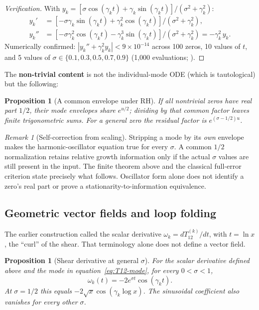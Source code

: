 \documentclass[11pt,a4paper]{article}
\theoremstyle{plain}
\newtheorem{proposition}[theorem]{Proposition}
\theoremstyle{definition}
\theoremstyle{remark}
\newtheorem{remark}[theorem]{Remark}
\begin{document}
\begin{proof}[Verification]
With $y_k = [\sigma\cos(\gamma_k t) + \gamma_k\sin(\gamma_k t)]/(\sigma^2 + \gamma_k^2)$:
\begin{align*}
  y_k' &= [-\sigma\gamma_k\sin(\gamma_k t) + \gamma_k^2\cos(\gamma_k t)] / (\sigma^2 + \gamma_k^2), \\
  y_k'' &= [-\sigma\gamma_k^2\cos(\gamma_k t) - \gamma_k^3\sin(\gamma_k t)] / (\sigma^2 + \gamma_k^2)
         = -\gamma_k^2\, y_k.
\end{align*}
Numerically confirmed: $|y_k'' + \gamma_k^2 y_k| < 9 \times 10^{-14}$
across 100 zeros, 10 values of $t$, and 5 values of $\sigma \in \{0.1, 0.3, 0.5, 0.7, 0.9\}$
(1{,}000 evaluations; ).
\end{proof}

The \textbf{non-trivial content} is not the individual-mode ODE (which
is tautological) but the following:

\begin{proposition}[A common envelope under RH]\label{prop:stationarity}
If all nontrivial zeros have real part $1/2$, their mode envelopes share
$e^{u/2}$; dividing by that common factor leaves finite trigonometric sums.
For a general zero the residual factor is $e^{(\sigma-1/2)u}$.
\end{proposition}
\begin{remark}[Self-correction from scaling]\label{rem:self-correction}
Stripping a mode by its \emph{own} envelope makes the harmonic-oscillator
equation true for every $\sigma$. A common $1/2$ normalization retains
relative growth information only if the actual $\sigma$ values are still
present in the input. The finite theorem above and the classical full-error
criterion state precisely what follows. Oscillator form alone does not
identify a zero's real part or prove a stationarity-to-information equivalence.
\end{remark}

\subsection{Geometric vector fields and loop folding}

The earlier construction called the scalar derivative
$\omega_k=dT_{12}^{(k)}/dt$, with $t=\ln x$, the ``curl'' of the shear.
That terminology alone does not define a vector field.

\begin{proposition}[Shear derivative at general $\sigma$]\label{prop:rotation}
For the scalar derivative defined above and the mode in
equation~\eqref{eq:T12-mode}, for every $0<\sigma<1$,
\begin{equation}\label{eq:curl-half}
  \omega_k(t)=-2e^{\sigma t}\cos(\gamma_k t).
\end{equation}
At $\sigma=1/2$ this equals $-2\sqrt{x}\cos(\gamma_k\log x)$.
The sinusoidal coefficient also vanishes for every other $\sigma$.
\end{proposition}
\end{document}
